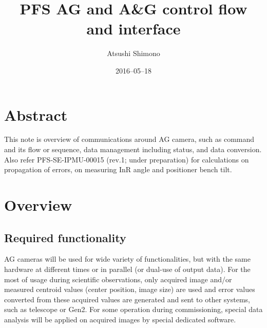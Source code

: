 \documentclass[a4paper,notitlepage]{article}
\title{PFS AG and A\&G control flow and interface}
\author{Atsushi Shimono}
\date{2016--05--18}
\begin{document}
\drafttrue
{}

\ssnhead

\section{Abstract}

This note is overview of communications around AG camera, such as command and 
its flow or sequence, data management including status, and data conversion. 
Also refer PFS-SE-IPMU-00015 
(rev.1; under preparation) for calculations on propagation of errors, 
on measuring InR angle and positioner bench tilt.

\section{Overview}

\subsection{Required functionality}

AG cameras will be used for wide variety of functionalities, but with the same 
hardware at different times or in parallel (or dual-use of output data). For 
the most of usage during scientific observations, only acquired image and/or 
measured centroid values (center position, image size) are used and error 
values converted from these acquired values are generated and sent to other 
systems, such as telescope or Gen2. For some operation during commissioning, 
special data analysis will be applied on acquired images by special dedicated 
software.
\end{document}
